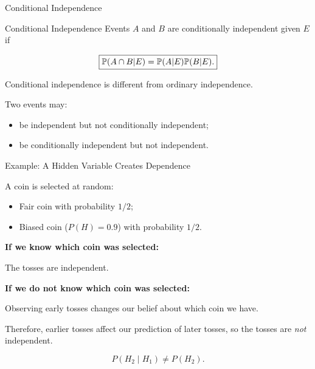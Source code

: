 \begin{frame}{Conditional Independence}
\begin{keybox}{Conditional Independence}
Events $A$ and $B$ are conditionally independent given $E$ if

\[
\boxed{
\mathbb{P}(A\cap B|E)
=
\mathbb{P}(A|E)\mathbb{P}(B|E).
}
\]
\end{keybox}

\vspace{0.25cm}

Conditional independence is different from ordinary independence.

\vspace{0.25cm}

Two events may:
\begin{itemize}
    \item be independent but not conditionally independent;
    \item be conditionally independent but not independent.
\end{itemize}
\end{frame}
\begin{frame}{Example: A Hidden Variable Creates Dependence}

A coin is selected at random:

\begin{itemize}
    \item Fair coin with probability $1/2$;
    \item Biased coin ($P(H)=0.9$) with probability $1/2$.
\end{itemize}

\vspace{0.2cm}

\textbf{If we know which coin was selected:}

The tosses are independent.

\vspace{0.2cm}

\textbf{If we do not know which coin was selected:}

Observing early tosses changes our belief about which coin we have.

Therefore, earlier tosses affect our prediction of later tosses, so the tosses are \emph{not} independent.

\[
P(H_2\mid H_1)\neq P(H_2).
\]

\end{frame}




